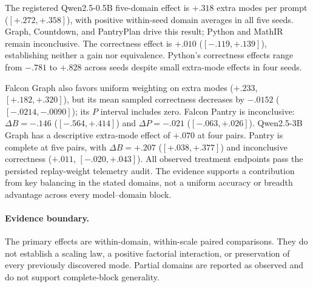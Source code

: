 \documentclass{article}
\newcommand{\1}{\mathbf 1}
\theoremstyle{remark}
\theoremstyle{definition}
\theoremstyle{plain}
\begin{document}
\begin{table}[H]
  \centering
  \caption{\textbf{Uniform versus fresh-frequency replay at pass 8.}
  Effects are uniform minus frequency weighting. Brackets give the paired
  percentile bootstrap interval for $\Delta B$ over all $5^5$ ordered
  resamples in complete blocks. Every observed treatment endpoint in this
  snapshot passes the persisted replay-weight telemetry audit. Partial blocks retain exact seed counts.
  \href{https://huggingface.co/od2961/maxent-grpo-models/blob/main/experiments/E120-R1/README.md\#comparators}{Paired model exports}.}
  \label{tab:current-e120}
  \scriptsize
  \setlength{\tabcolsep}{3pt}
\end{table}


The registered Qwen2.5-0.5B five-domain effect is $+.318$ extra modes per
prompt ($[+.272,+.358]$), with positive within-seed domain averages in all
five seeds. Graph, Countdown, and PantryPlan drive this result; Python and
MathIR remain inconclusive. The correctness effect is $+.010$
($[-.119,+.139]$), establishing neither a gain nor equivalence. Python's
correctness effects range from $-.781$ to $+.828$ across seeds despite
small extra-mode effects in four seeds.

Falcon Graph also favors uniform weighting on extra modes ($+.233$,
$[+.182,+.320]$), but its mean sampled correctness decreases by $-.0152$
($[-.0214,-.0090]$); its $P$ interval includes zero. Falcon Pantry is
inconclusive: $\Delta B=-.146$ ($[-.564,+.414]$) and $\Delta P=-.021$
($[-.063,+.026]$). Qwen2.5-3B Graph has a descriptive extra-mode effect of $+.070$
at four pairs. Pantry is complete at five pairs, with $\Delta B=+.207$
($[+.038,+.377]$) and inconclusive correctness ($+.011$, $[-.020,+.043]$). All observed treatment
endpoints pass the persisted replay-weight telemetry audit. The evidence
supports a contribution from key balancing in the stated domains, not a
uniform accuracy or breadth advantage across every model--domain block.

\paragraph{Evidence boundary.}
\label{app:scale-boundary}
The primary effects are within-domain, within-scale paired comparisons.
They do not establish a scaling law, a positive factorial interaction, or
preservation of every previously discovered mode. Partial domains are
reported as observed and do not support complete-block generality.
\end{document}
